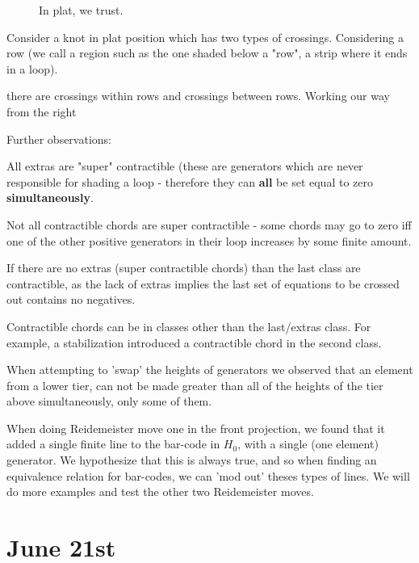 \documentclass[11pt,oneside]{amsart}
\begin{document}
\begin{figure}[htbp]
  \label{fig:PlatProof}
  \centering
  
  \caption{In plat, we trust.}
\end{figure}


Consider a knot in plat position which has two types of crossings. Considering a row (we call a region such as the one shaded below a "row", a strip where it ends in a loop).



there are crossings within rows and crossings between rows. Working our way from the right






Further observations:

All extras are "super" contractible (these are generators which are never responsible for shading a loop - therefore they can \textbf{all} be set equal to zero \textbf{simultaneously}.

Not all contractible chords are super contractible - some chords may go to zero iff one of the other positive generators in their loop increases by some finite amount. 


If there are no extras (super contractible chords) than the last class are contractible, as the lack of extras implies the last set of equations to be crossed out contains no negatives. 


Contractible chords can be in classes other than the last/extras class. For example, a stabilization introduced a contractible chord in the second class.

When attempting to 'swap' the heights of generators we observed that an element from a lower tier, can not be made greater than all of the heights of the tier above simultaneously, only some of them.

When doing Reidemeister move one in the front projection, we found that it added a single finite line to the bar-code in $H_0$, with a single (one element) generator. We hypothesize that this is always true, and so when finding an equivalence relation for bar-codes, we can 'mod out' theses types of lines. We will do more examples and test the other two Reidemeister moves.








\section{June 21st}
\end{document}
